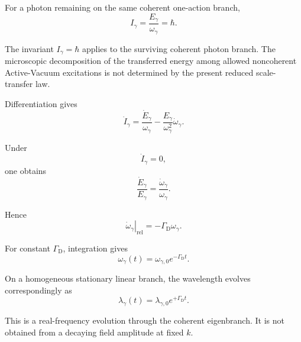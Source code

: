 For a photon remaining on the same coherent one-action branch,
\begin{equation}
    I_{\gamma}
    =
    \frac{
        E_{\gamma}
    }{
        \omega_{\gamma}
    }
    =
    \hbar.
\end{equation}

The invariant $I_{\gamma}=\hbar$ applies to the surviving coherent photon
branch. The microscopic decomposition of the transferred energy among allowed
noncoherent Active-Vacuum excitations is not determined by the present reduced
scale-transfer law.

Differentiation gives
\begin{equation}
    \dot I_{\gamma}
    =
    \frac{
        \dot E_{\gamma}
    }{
        \omega_{\gamma}
    }
    -
    \frac{
        E_{\gamma}
    }{
        \omega_{\gamma}^{2}
    }
    \dot\omega_{\gamma}.
\end{equation}

Under
\begin{equation}
    \dot I_{\gamma}=0,
\end{equation}
one obtains
\begin{equation}
    \frac{
        \dot E_{\gamma}
    }{
        E_{\gamma}
    }
    =
    \frac{
        \dot\omega_{\gamma}
    }{
        \omega_{\gamma}
    }.
\end{equation}

Hence
\begin{equation}
    \boxed{
    \left.\dot\omega_{\gamma}\right|_{\mathrm{rel}}
    =
    -\Gamma_{\mathrm D}\omega_{\gamma}.
    }
    \label{eq:AQ_omega_evolution}
\end{equation}

For constant $\Gamma_{\mathrm D}$, integration gives
\begin{equation}
    \boxed{
    \omega_{\gamma}(t)
    =
    \omega_{\gamma,0}
    e^{-\Gamma_{\mathrm D}t}.
    }
    \label{eq:AQ_omega_solution}
\end{equation}

On a homogeneous stationary linear branch, the wavelength evolves
correspondingly as
\begin{equation}
    \boxed{
    \lambda_{\gamma}(t)
    =
    \lambda_{\gamma,0}
    e^{+\Gamma_{\mathrm D}t}.
    }
    \label{eq:AQ_lambda_solution}
\end{equation}

This is a real-frequency evolution through the coherent eigenbranch. It is not
obtained from a decaying field amplitude at fixed $k$.


